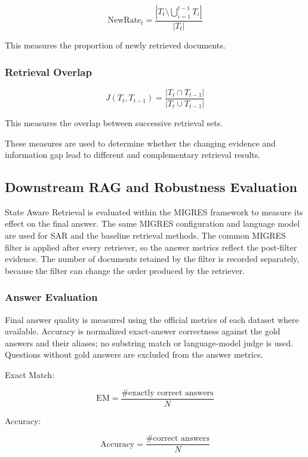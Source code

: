 \documentclass[12pt,a4paper]{report}
\begin{document}
\[
\mathrm{NewRate}_t
=
\frac{
\left|
T_t
\setminus
\bigcup_{i=1}^{t-1}T_i
\right|
}
{|T_t|}
\]

This measures the proportion of newly retrieved documents.

\subsubsection{Retrieval Overlap}

\[
J(T_t,T_{t-1})
=
\frac{|T_t\cap T_{t-1}|}
{|T_t\cup T_{t-1}|}
\]

This measures the overlap between successive retrieval sets.

These measures are used to determine whether the changing evidence and
information gap lead to different and complementary retrieval results.

\subsection{Downstream RAG and Robustness Evaluation}
\label{sec:downstream}

State Aware Retrieval is evaluated within the MIGRES framework to
measure its effect on the final answer. The same MIGRES configuration
and language model are used for SAR and the baseline retrieval methods. The common MIGRES filter is applied after every retriever, so the answer metrics reflect the post-filter evidence. The number of documents retained by the filter is recorded separately, because the filter can change the order produced by the retriever.

\subsubsection{Answer Evaluation}

Final answer quality is measured using the official metrics of each
dataset where available. Accuracy is normalized exact-answer correctness against the gold answers and their aliases; no substring match or language-model judge is used. Questions without gold answers are excluded from the answer metrics.

Exact Match:

\[
\mathrm{EM}
=
\frac{
\#\text{exactly correct answers}
}
{N}
\]

Accuracy:

\[
\mathrm{Accuracy}
=
\frac{
\#\text{correct answers}
}
{N}
\]
\end{document}
